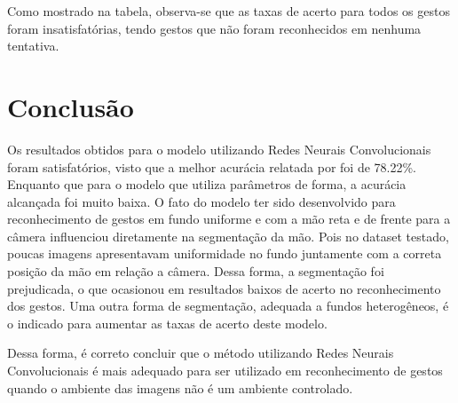\documentclass[conference]{IEEEtran}
\begin{document}
\par Como mostrado na tabela, observa-se que as taxas de acerto para todos os gestos foram insatisfatórias, tendo gestos que não foram reconhecidos em nenhuma tentativa.   

\section{Conclusão}
Os resultados obtidos para o modelo utilizando Redes Neurais Convolucionais foram satisfatórios, visto que a melhor acurácia relatada por \cite{hand} foi de 78.22\%. Enquanto que para o modelo que utiliza parâmetros de forma, a acurácia alcançada foi muito baixa. O fato do modelo ter sido desenvolvido para reconhecimento de gestos em fundo uniforme e com a mão reta e de frente para a câmera influenciou diretamente na segmentação da mão. Pois no dataset testado, poucas imagens apresentavam uniformidade no fundo juntamente com a correta posição da mão em relação a câmera. Dessa forma, a segmentação foi prejudicada, o que ocasionou em resultados baixos de acerto no reconhecimento dos gestos. Uma outra forma de segmentação, adequada a fundos heterogêneos, é o indicado para aumentar as taxas de acerto deste modelo.  
\par Dessa forma, é correto concluir que o método utilizando Redes Neurais Convolucionais é mais adequado para ser utilizado em reconhecimento de gestos quando o ambiente das imagens não é um ambiente controlado.

{}

\end{document}
